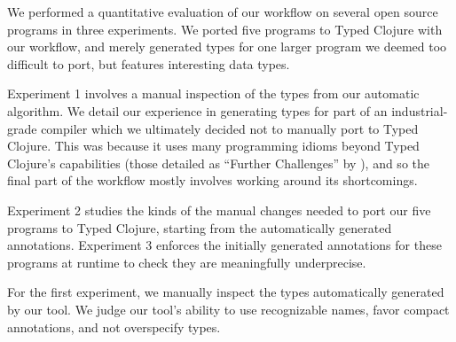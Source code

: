 \label{infer:chap:evaluation}

We performed a quantitative evaluation of our workflow on several open source programs
in three experiments.
We ported five programs to Typed Clojure with our workflow,
and merely generated types for one larger program we deemed too difficult to port,
but features interesting data types.

Experiment 1 involves a manual inspection of the types from our automatic algorithm.
We detail our experience in generating types for part of an industrial-grade compiler which
we ultimately decided not to manually port to Typed Clojure.
This was because it uses many programming idioms beyond Typed Clojure's capabilities
(those detailed as ``Further Challenges'' by ),
and so the final part of the workflow mostly involves working around its shortcomings.

Experiment 2 studies the kinds of the manual changes needed to port our five programs
to Typed Clojure, starting from the automatically generated annotations.
Experiment 3 enforces the initially generated annotations for these programs at runtime
to check they are meaningfully underprecise.


\label{infer:sec:experiment1}

For the first experiment, we manually inspect the types automatically generated by our tool.
We judge our tool's ability to
use recognizable names,
favor compact annotations, and
not overspecify types.

